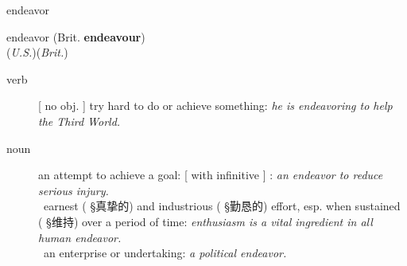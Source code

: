 \documentclass[avery5372, grid]{flashcards}
\begin{document}
\begin{flashcard}{\Huge endeavor}
	\begin{center}
		{\LARGE en\textbullet deav\textbullet or} \normalsize{({\A Brit.} \textbf{endeavour})}\\
		(\textit{U.S.})\hspace{0.25cm}(\textit{Brit.})
	\end{center}
	\begin{description}
		
		\item[verb] %
			 [ no obj. ]
			 try hard to do or achieve something: \textit{he is endeavoring to help the Third World.}
			
			
			
		
		\item[noun] %
			an attempt to achieve a goal: [ with infinitive ] : \textit{an endeavor to reduce serious injury.}\\
			\textbullet\ earnest \textnormal{(%
			 {\S 真挚的})} and industrious \textnormal{(%
			 {\S 勤恳的})} effort, esp. when sustained \textnormal{(%
			 {\S 维持})} over a period of time: \textit{enthusiasm is a vital ingredient in all human endeavor.}\\
			\textbullet\ an enterprise or undertaking: \textit{a political endeavor.}\\
			

\end{description}
\end{flashcard}
\end{document}

